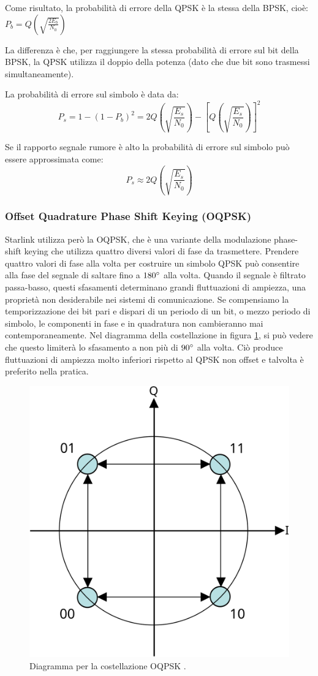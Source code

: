 Come risultato, la probabilità di errore della \ac{QPSK} è la stessa della \ac{BPSK}, cioè: $P_b = Q(\sqrt{\frac{2 E_b}{N_0}})$

La differenza è che, per raggiungere la stessa probabilità di errore sul bit della \ac{BPSK}, la \ac{QPSK} utilizza il doppio della potenza (dato che due bit sono trasmessi simultaneamente).

La probabilità di errore sul simbolo è data da:
$$P_s = 1 - (1-P_b)^2 = 2Q(\sqrt{\frac{E_s}{N_0}}) - [Q(\sqrt{\frac{E_s}{N_0}})]^2$$

Se il rapporto segnale rumore è alto la probabilità di errore sul simbolo può essere approssimata come:
$$P_s \approx 2Q(\sqrt{\frac{E_s}{N_0}})$$

\subsubsection{Offset Quadrature Phase Shift Keying (OQPSK)}
Starlink utilizza però la \ac{OQPSK}, che è una variante della modulazione phase-shift keying che utilizza quattro diversi valori di fase da trasmettere.
Prendere quattro valori di fase alla volta per costruire un simbolo \ac{QPSK} può consentire alla fase del segnale di saltare fino a $180 \degree$ alla volta.
Quando il segnale è filtrato passa-basso, questi sfasamenti determinano grandi fluttuazioni di ampiezza, una proprietà non desiderabile nei sistemi di comunicazione.
Se compensiamo la temporizzazione dei bit pari e dispari di un periodo di un bit, o mezzo periodo di simbolo, le componenti in fase e in quadratura non cambieranno mai contemporaneamente.
Nel diagramma della costellazione in figura \ref{fig:oqpsk-diagram}, si può vedere che questo limiterà lo sfasamento a non più di $90 \degree$ alla volta.
Ciò produce fluttuazioni di ampiezza molto inferiori rispetto al \ac{QPSK} non offset e talvolta è preferito nella pratica.

\begin{figure}[htbp]
  \centering
  \includegraphics[width=0.4\linewidth]{./res/img/oqpsk_diagram.png}
  \caption{Diagramma per la costellazione OQPSK \cite{wikipedia_phase-shift_nodate}.}
  \label{fig:oqpsk-diagram}
\end{figure}

